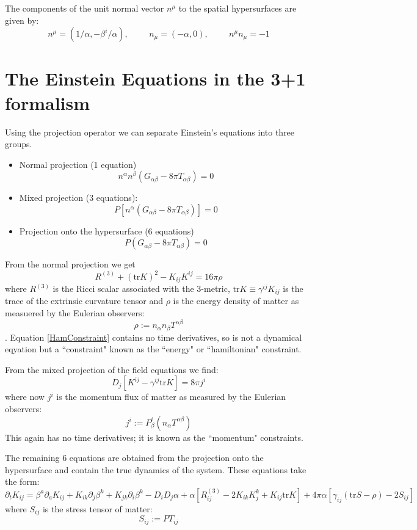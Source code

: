 The components of the unit normal vector $n^\mu$ to the spatial hypersurfaces are given by:
\[ n^\mu = (1/ \alpha, -\beta^i / \alpha), \hspace{1cm} n_\mu=(-\alpha,0), \hspace{1cm} n^\mu n_\mu= -1 \]




\section{The Einstein Equations in the 3+1 formalism}
Using the projection operator we can separate Einstein's equations into three groups.
\begin{itemize}
\item Normal projection (1 equation)
\[ n^\alpha n^\beta(G_{\alpha \beta}-8\pi T_{\alpha \beta})=0\]
\item Mixed projection (3 equations):
\[ P[n^\alpha ( G_{\alpha \beta}-8\pi T_{\alpha \beta})]=0\]
\item Projection onto the hypersurface (6 equations)
\[ P( G_{\alpha \beta}-8\pi T_{\alpha \beta})=0 \]
\end{itemize}

From the normal projection we get
\begin{equation}\label{HamConstraint}
R^{(3)} + ( \mbox{tr} K)^2-K_{ij}K^{ij}=16\pi\rho
\end{equation}  
where $R^{(3)}$ is the Ricci scalar associated with the 3-metric, $\mbox{tr} K \equiv \gamma^{ij}K_{ij}$ is the trace of the extrinsic curvature tensor and $\rho$ is the energy density of matter as measuered by the Eulerian observers:
\[ \rho := n_\alpha n_\beta T^{\alpha \beta} \].
Equation \ref{HamConstraint} contains no time derivatives, so is not a dynamical eqyation but a ``constraint" known as the ``energy" or ``hamiltonian" constraint.

From the mixed projection of the field equations we find:
\begin{equation}\label{MomConstraint}
D_j [ K^{ij}-\gamma^{ij} \mbox{tr}K]=8\pi j^i
\end{equation} 
where now $j^i$ is the momentum flux of matter as measured by the Eulerian observers: 
\[ j^i := P^i_\beta \left(n_\alpha T^{\alpha \beta} \right) \]
This again has no time derivatives; it is known as the ``momentum" constraints.

The remaining 6 equations are obtained from the projection onto the hypersurface and contain the true dynamics of the system. These equations take the form:
\[ \partial_t K_{ij} = \beta^a \partial_a K_{ij} + K_{ik} \partial_j \beta^k + K_{jk}\partial_i \beta^k - D_i D_j \alpha +\alpha[R^{(3)}_{ij}-2K_{ik}K^k_j + K_{ij} \mbox{tr} K] +4\pi\alpha[\gamma_{ij}(\mbox{tr} S-\rho)-2S_{ij}] \]
where $S_{ij}$ is the stress tensor of matter:
\[ S_{ij} := P T_{ij}\]

